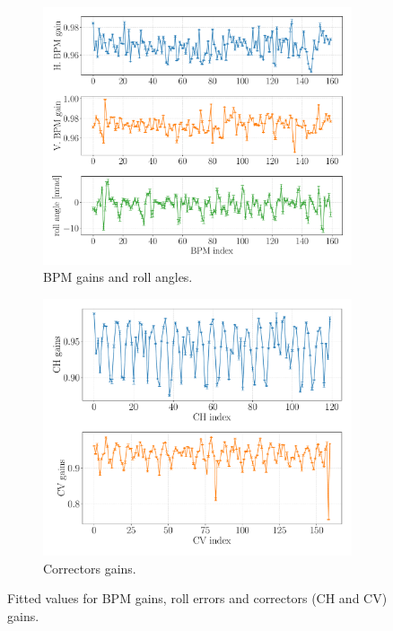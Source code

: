 \begin{figure}[h!]
\centering
\begin{subfigure}[t]{0.49\textwidth}
\includegraphics[width=1.0\textwidth]{figures/bpm_gains_iter0_big.pdf}
    \caption{BPM gains and roll angles.}
    \label{subfig:bpm_fit}
\end{subfigure}
 \begin{subfigure}[t]{0.49\textwidth}
\includegraphics[width=1.0\textwidth]{figures/corr_gains_iter0_big.pdf}
    \caption{Correctors gains.}
    \label{subfig:corr_fit}
\end{subfigure}
\caption{Fitted values for BPM gains, roll errors and correctors (CH and CV) gains.}
\label{fig:gain_fit}
\end{figure}

